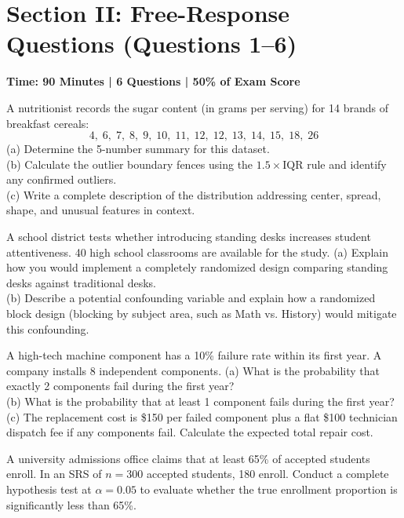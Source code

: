 \section{Section II: Free-Response Questions (Questions 1--6)}
\textbf{Time: 90 Minutes | 6 Questions | 50\% of Exam Score}

\begin{workbookbox}
A nutritionist records the sugar content (in grams per serving) for 14 brands of breakfast cereals:
\[ 4, \; 6, \; 7, \; 8, \; 9, \; 10, \; 11, \; 12, \; 12, \; 13, \; 14, \; 15, \; 18, \; 26 \]
(a) Determine the 5-number summary for this dataset.\\
(b) Calculate the outlier boundary fences using the $1.5 \times \text{IQR}$ rule and identify any confirmed outliers.\\
(c) Write a complete description of the distribution addressing center, spread, shape, and unusual features in context.
\end{workbookbox}

\begin{workbookbox}
A school district tests whether introducing standing desks increases student attentiveness. 40 high school classrooms are available for the study.
(a) Explain how you would implement a completely randomized design comparing standing desks against traditional desks.\\
(b) Describe a potential confounding variable and explain how a randomized block design (blocking by subject area, such as Math vs. History) would mitigate this confounding.
\end{workbookbox}

\begin{workbookbox}
A high-tech machine component has a 10\% failure rate within its first year. A company installs 8 independent components.
(a) What is the probability that exactly 2 components fail during the first year?\\
(b) What is the probability that at least 1 component fails during the first year?\\
(c) The replacement cost is \$150 per failed component plus a flat \$100 technician dispatch fee if any components fail. Calculate the expected total repair cost.
\end{workbookbox}

\begin{workbookbox}
A university admissions office claims that at least 65\% of accepted students enroll. In an SRS of $n = 300$ accepted students, 180 enroll.
Conduct a complete hypothesis test at $\alpha = 0.05$ to evaluate whether the true enrollment proportion is significantly less than 65\%.
\end{workbookbox}

